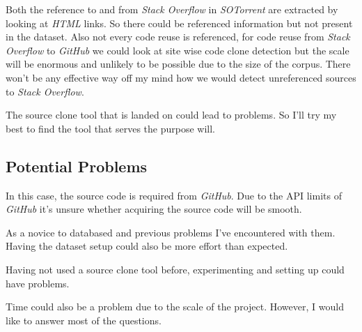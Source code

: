 \documentclass[sigconf]{acmart}
\begin{document}
Both the reference to and from \textit{Stack Overflow} in \textit{SOTorrent} are extracted by looking at \textit{HTML} links. So there could be referenced information but not present in the dataset. Also not every code reuse is referenced, for code reuse from \textit{Stack Overflow} to \textit{GitHub} we could look at site wise code clone detection but the scale will be enormous and unlikely to be possible due to the size of the corpus. There won't be any effective way off my mind how we would detect unreferenced sources to \textit{Stack Overflow}.

The source clone tool that is landed on could lead to problems. So I'll try my best to find the tool that serves the purpose will.

\subsection{Potential Problems}

In this case, the source code is required from \textit{GitHub}. Due to the API limits of \textit{GitHub} it's unsure whether acquiring the source code will be smooth. 

As a novice to databased and previous problems I've encountered with them. Having the dataset setup could also be more effort than expected. 

Having not used a source clone tool before, experimenting and setting up could have problems.

Time could also be a problem due to the scale of the project. However, I would like to answer most of the questions.




\end{document}
